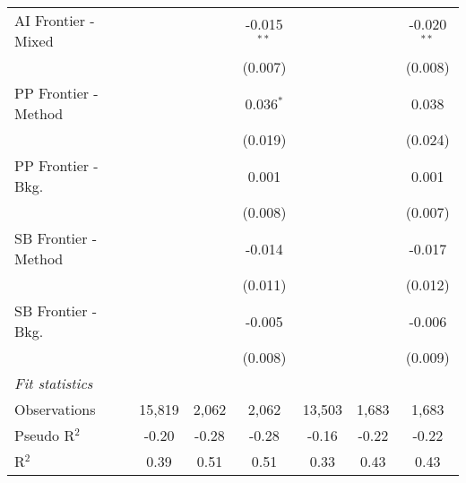 \begin{tabular}{lcccccc}
   AI Frontier - Mixed  &         &              & -0.015$^{**}$ &              &         & -0.020$^{**}$\\   
                        &         &              & (0.007)       &              &         & (0.008)\\   
   PP Frontier - Method &         &              & 0.036$^{*}$   &              &         & 0.038\\   
                        &         &              & (0.019)       &              &         & (0.024)\\   
   PP Frontier - Bkg.   &         &              & 0.001         &              &         & 0.001\\   
                        &         &              & (0.008)       &              &         & (0.007)\\   
   SB Frontier - Method &         &              & -0.014        &              &         & -0.017\\   
                        &         &              & (0.011)       &              &         & (0.012)\\   
   SB Frontier - Bkg.   &         &              & -0.005        &              &         & -0.006\\   
                        &         &              & (0.008)       &              &         & (0.009)\\   
   \midrule
   \emph{Fit statistics}\\
   Observations         & 15,819  & 2,062        & 2,062         & 13,503       & 1,683   & 1,683\\  
   Pseudo R$^2$         & -0.20   & -0.28        & -0.28         & -0.16        & -0.22   & -0.22\\  
   R$^2$                & 0.39    & 0.51         & 0.51          & 0.33         & 0.43    & 0.43\\  
   

\end{tabular}
